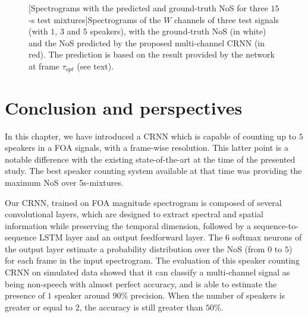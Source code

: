 \begin{figure}[t]
    \begin{center}
    [Spectrograms with the predicted and ground-truth NoS for three $15$-s test mixtures]{Spectrograms of the $W$ channels of three test signals (with $1$, $3$ and $5$ speakers), with the ground-truth NoS (in white) and the NoS predicted by the proposed multi-channel CRNN (in red). The prediction is based on the result provided by the network at frame $\tau_{opt}$ (see text).}
    \label{fig:predictionExample}
    \end{center}
\end{figure}

\clearpage
\section{Conclusion and perspectives}

In this chapter, we have introduced a CRNN which is capable of counting up to $5$ speakers in a FOA signals, with a frame-wise resolution. This latter point is a notable difference with the existing state-of-the-art at the time of the presented study. The best speaker counting system available at that time \cite{stoter_countnet:_2019} was providing the maximum NoS over 5s-mixtures.

Our CRNN, trained on FOA magnitude spectrogram is composed of several convolutional layers, which are designed to extract spectral and spatial information while preserving the temporal dimension, followed by a sequence-to-sequence LSTM layer and an output feedforward layer. The $6$ softmax neurons of the output layer estimate a probability distribution over the NoS (from $0$ to $5$) for each frame in the input spectrogram. The evaluation of this speaker counting CRNN on simulated data showed that it can classify a multi-channel signal as being non-speech with almost perfect accuracy, and is able to estimate the presence of $1$ speaker around $90$\% precision. When the number of speakers is greater or equal to $2$, the accuracy is still greater than $50\%.$

